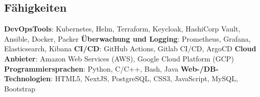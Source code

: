 \documentclass[../main.tex]{subfiles}
\begin{document}
\begin{category}
\section{Fähigkeiten}
    \citembullet \textbf{DevOpsTools}: Kubernetes, Helm, Terraform, Keycloak, HashiCorp Vault, Ansible, Docker, Packer
    \citembullet \textbf{Überwachung und Logging}: Prometheus, Grafana, Elasticsearch, Kibana
    \citembullet \textbf{CI/CD}: GitHub Actions, Gitlab CI/CD, ArgoCD
    \citembullet \textbf{Cloud Anbieter}: Amazon Web Services (AWS), Google Cloud Platform (GCP)
    \citembullet \textbf{Programmiersprachen}: Python, C/C++, Bash, Java
    \citembullet \textbf{Web-/DB-Technologien}: HTML5, NextJS, PostgreSQL, CSS3, JavaScript, MySQL, Bootstrap
    \\[-12pt]
\end{category}
\end{document}
